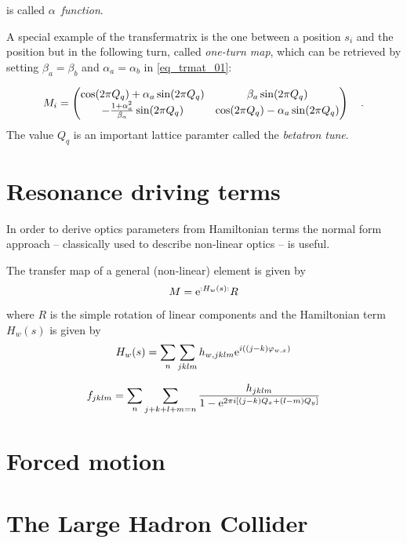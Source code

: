 is called $\alpha$~\emph{function}.

A special example of the transfermatrix is the one between a position $s_i$ and the position but in
the following turn, called \emph{one-turn map}, which can be retrieved by setting $\beta_a = \beta_b $
and $\alpha_a = \alpha_b$ in \eqref{eq_trmat_01}:

\begin{equation}
    M_i = \begin{pmatrix}
        \cos(2\pi Q_q) + \alpha_a \sin(2\pi Q_q) & \beta_a\sin(2\pi Q_q) \\
        -\frac{1+\alpha_a^2}{\beta_a}\sin(2\pi Q_q) & \cos(2\pi Q_q) - \alpha_a\sin(2\pi Q_q)
    \end{pmatrix}
    \quad .
\end{equation}
The value $Q_q$ is an important lattice paramter called the \emph{betatron tune}.



\section{Resonance driving terms}

In order to derive optics parameters from Hamiltonian terms the normal form approach -- classically
used to describe non-linear optics -- is useful. 

The transfer map of a general (non-linear) element is given by
\begin{equation}
    M= \text{e}^{:H_w(s):}R
\end{equation}
where $R$ is the simple rotation of linear components and the Hamiltonian term $H_w(s)$ is given by
\begin{equation}
    H_w(s) = \sum\limits_n\sum\limits_{jklm} h_{w,jklm}\text{e}^{i\left((j-k)\varphi_{w,x}\right)}
\end{equation}

\begin{equation}
    f_{jklm}=\sum\limits_{n}\sum\limits_{j+k+l+m=n} \frac{h_{jklm} }{1-\text{e}^{2\pi i [(j-k)Q_x+(l-m)Q_y]}}
\end{equation}


\section{Forced motion}

\section{The Large Hadron Collider}

